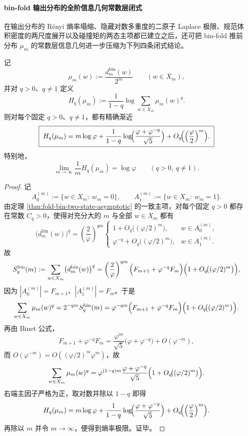 \paragraph{bin-fold 输出分布的全阶信息几何常数层闭式}
在输出分布的 Rényi 熵率塌缩、隐藏对数多重度的二原子 Laplace 极限、规范体积密度的两尺度展开以及碰撞矩的两态主项都已建立之后，还可把 bin-fold 推前分布 \(\mu_m\) 的常数层信息几何进一步压缩为下列四条闭式结论。

\begin{theorem}\label{thm:xi-time-part70ad-binfold-renyi-entropy-constant-drift}
记
\[
\mu_m(w):=\frac{d_m^{\mathrm{bin}}(w)}{2^m}
\qquad (w\in X_m),
\]
并对 \(q>0\)、\(q\neq 1\) 定义
\[
H_q(\mu_m):=\frac{1}{1-q}\log\sum_{w\in X_m}\mu_m(w)^q.
\]
则对每个固定 \(q>0\)、\(q\neq 1\)，都有精确渐近
\[
\boxed{\;
H_q(\mu_m)
=
m\log\varphi
+
\frac{1}{1-q}\log\!\Bigl(\frac{\varphi+\varphi^{-q}}{\sqrt5}\Bigr)
+
O_q\!\Bigl(\Bigl(\frac{\varphi}{2}\Bigr)^m\Bigr).\;}
\]
特别地，
\[
\boxed{\;
\lim_{m\to\infty}\frac{1}{m}H_q(\mu_m)=\log\varphi
\qquad (q>0,\ q\neq 1).\;}
\]
\end{theorem}
\begin{proof}
记
\[
A_0^{(m)}:=\{w\in X_m:\ w_m=0\},
\qquad
A_1^{(m)}:=\{w\in X_m:\ w_m=1\}.
\]
由定理 \ref{thm:fold-bin-two-state-asymptotic} 的一致主项，对每个固定 \(q>0\) 都存在常数 \(C_q>0\)，使得对充分大的 \(m\) 与全部 \(w\in X_m\) 都有
\[
\bigl(d_m^{\mathrm{bin}}(w)\bigr)^q
=
\left(\frac{2}{\varphi}\right)^{qm}
\begin{cases}
1+O_q\!\bigl((\varphi/2)^m\bigr), & w\in A_0^{(m)},\\[4pt]
\varphi^{-q}+O_q\!\bigl((\varphi/2)^m\bigr), & w\in A_1^{(m)}.
\end{cases}
\]
故
\[
S_q^{\mathrm{bin}}(m):=\sum_{w\in X_m}\bigl(d_m^{\mathrm{bin}}(w)\bigr)^q
=
\left(\frac{2}{\varphi}\right)^{qm}
\Bigl(
F_{m+1}+\varphi^{-q}F_m
\Bigr)
\Bigl(1+O_q\!\bigl((\varphi/2)^m\bigr)\Bigr),
\]
因为 \(|A_0^{(m)}|=F_{m+1}\)、\(|A_1^{(m)}|=F_m\)。于是
\[
\sum_{w\in X_m}\mu_m(w)^q
=
2^{-qm}S_q^{\mathrm{bin}}(m)
=
\varphi^{-qm}
\Bigl(
F_{m+1}+\varphi^{-q}F_m
\Bigr)
\Bigl(1+O_q\!\bigl((\varphi/2)^m\bigr)\Bigr).
\]
再由 Binet 公式，
\[
F_{m+1}+\varphi^{-q}F_m
=
\frac{\varphi^m}{\sqrt5}\bigl(\varphi+\varphi^{-q}\bigr)+O(\varphi^{-m}),
\]
而 \(O(\varphi^{-m})=O((\varphi/2)^m\varphi^m)\)，故
\[
\sum_{w\in X_m}\mu_m(w)^q
=
\varphi^{(1-q)m}
\frac{\varphi+\varphi^{-q}}{\sqrt5}
\Bigl(1+O_q\!\bigl((\varphi/2)^m\bigr)\Bigr).
\]
右端主因子严格为正，取对数并除以 \(1-q\) 即得
\[
H_q(\mu_m)
=
m\log\varphi
+
\frac{1}{1-q}\log\!\Bigl(\frac{\varphi+\varphi^{-q}}{\sqrt5}\Bigr)
+
O_q\!\Bigl(\Bigl(\frac{\varphi}{2}\Bigr)^m\Bigr).
\]
再除以 \(m\) 并令 \(m\to\infty\)，便得到熵率极限。证毕。
\end{proof}

